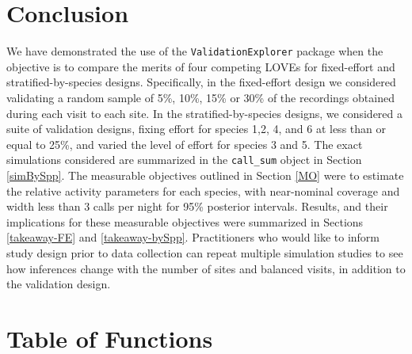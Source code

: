 \documentclass[
]{article}
\begin{document}
\section{Conclusion}\label{conclusion}

We have demonstrated the use of the \texttt{ValidationExplorer} package when the objective is to compare the merits of four competing LOVEs for fixed-effort and stratified-by-species designs. Specifically, in the fixed-effort design we considered validating a random sample of 5\%, 10\%, 15\% or 30\% of the recordings obtained during each visit to each site. In the stratified-by-species designs, we considered a suite of validation designs, fixing effort for species 1,2, 4, and 6 at less than or equal to 25\%, and varied the level of effort for species 3 and 5. The exact simulations considered are summarized in the \texttt{call\_sum} object in Section \ref{simBySpp}. The measurable objectives outlined in Section \ref{MO} were to estimate the relative activity parameters for each species, with near-nominal coverage and width less than 3 calls per night for 95\% posterior intervals. Results, and their implications for these measurable objectives were summarized in Sections \ref{takeaway-FE} and \ref{takeaway-bySpp}. Practitioners who would like to inform study design prior to data collection can repeat multiple simulation studies to see how inferences change with the number of sites and balanced visits, in addition to the validation design.

\newpage

\section{\texorpdfstring{Table of Functions \label{BigTable}}{Table of Functions }}\label{table-of-functions}
\end{document}
